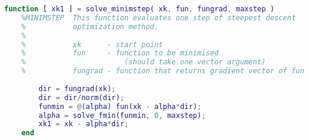 \documentclass[12pt]{article}
\begin{document}
\begin{lstlisting}[language=MATLAB, style=mystyle]
    function [ xk1 ] = solve_minimstep( xk, fun, fungrad, maxstep )
    %MINIMSTEP  This function evaluates one step of steepest descent
    %           optimization method.
    %
    %           xk      - start point
    %           fun     - function to be minimised
    %                       (should take one vector argument)
    %           fungrad - function that returns gradient vector of fun
    
        dir = fungrad(xk);
        dir = dir/norm(dir);
        funmin = @(alpha) fun(xk - alpha*dir);
        alpha = solve_fmin(funmin, 0, maxstep);
        xk1 = xk - alpha*dir;
    end
\end{lstlisting}
\end{document}
